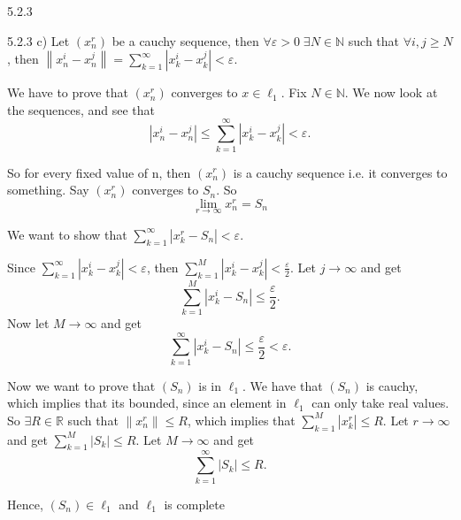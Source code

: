 \documentclass[a4paper,norsk]{article}
\renewcommand{\geq}{\geqslant}
\renewcommand{\leq}{\leqslant}
\renewcommand{\epsilon}{\varepsilon}
\begin{document}
\begin{oppgavebox}{5.2.3}{}
\begin{itemize}
\begin{proofbox}{5.2.3 c)}{}
    Let $ \left( x_n^r \right)  $ be a cauchy sequence, then $ \forall \epsilon > 0 \; \exists N \in \mathbb{N} $ such that $ \forall i, j \geq N $, then $ \left\lVert x_n^i - x_n^j \right\rVert = \sum_{k=1}^{\infty} \left| x_k^i - x_k^j \right|   < \epsilon  $. 

    We have to prove that $ \left( x_n^r \right)  $ converges to $ x \in \ell_1 $. Fix $ N \in \mathbb{N} $. We now look at the sequences, and see that 
    \[
        \left| x_n^i - x_n^j \right| \leq \sum_{k=1}^{\infty} \left| x_k^i - x_k^j \right| < \epsilon.
    \]

    So for every fixed value of n, then $ \left( x_n^r \right)  $ is a cauchy sequence i.e. it converges to something. Say $ \left( x_n^r \right)  $ converges to $ S_n $. So 
    \[
        \lim_{r \to \infty} x_n^r = S_n
    \]

    We want to show that $ \sum_{k=1}^{\infty} \left| x_k^r - S_n \right| < \epsilon    $. 

    Since $ \sum_{k=1}^{\infty} \left| x_k^i - x_k^j \right| < \epsilon    $, then $ \sum_{k=1}^{M} \left| x_k^i - x_k^j \right| < \frac{ \epsilon }{ 2 }    $. Let $ j \to \infty $ and get
    \[
        \sum_{k=1}^{M} \left| x_k^i - S_n \right| \leq  \frac{ \epsilon  }{ 2 }.
    \]
    Now let $ M \to \infty $ and get
    \[
        \sum_{k=1}^{\infty}  \left| x_k^i - S_n \right| \leq \frac{ \epsilon  }{ 2 } < \epsilon. 
    \]

    Now we want to prove that $ \left( S_n \right)  $ is in $ \ell_1 $. We have that $ \left( S_n \right)  $ is cauchy, which implies that its bounded, since an element in $ \ell_1 $ can only take real values. So $ \exists R \in \mathbb{R} $ such that $ \left\lVert x_n^r  \right\rVert \leq R $, which implies that $ \sum_{k=1}^{M} \left| x_k^r \right| \leq R  $. Let $ r \to \infty $ and get $ \sum_{k=1}^{M} \left| S_k \right| \leq R  $. Let $ M \to \infty $ and get
    \[
        \sum_{k=1}^{\infty} \left| S_k \right|  \leq R.
    \]
     
    Hence, $ \left( S_n \right) \in \ell_1 $ and $ \ell_1 $ is complete
     
    
    
    
  \end{proofbox}
\end{itemize}
\end{oppgavebox}
\end{document}
